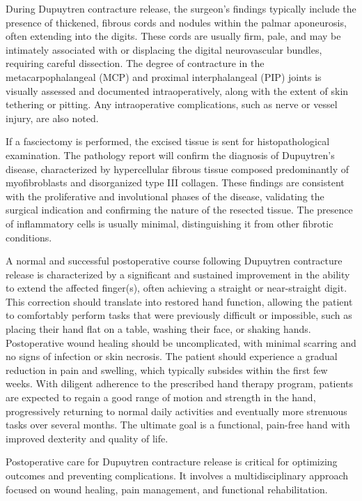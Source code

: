 During Dupuytren contracture release, the surgeon's findings typically include the presence of thickened, fibrous cords and nodules within the palmar aponeurosis, often extending into the digits. These cords are usually firm, pale, and may be intimately associated with or displacing the digital neurovascular bundles, requiring careful dissection. The degree of contracture in the metacarpophalangeal (MCP) and proximal interphalangeal (PIP) joints is visually assessed and documented intraoperatively, along with the extent of skin tethering or pitting. Any intraoperative complications, such as nerve or vessel injury, are also noted.

If a fasciectomy is performed, the excised tissue is sent for histopathological examination. The pathology report will confirm the diagnosis of Dupuytren's disease, characterized by hypercellular fibrous tissue composed predominantly of myofibroblasts and disorganized type III collagen. These findings are consistent with the proliferative and involutional phases of the disease, validating the surgical indication and confirming the nature of the resected tissue. The presence of inflammatory cells is usually minimal, distinguishing it from other fibrotic conditions.

A normal and successful postoperative course following Dupuytren contracture release is characterized by a significant and sustained improvement in the ability to extend the affected finger(s), often achieving a straight or near-straight digit. This correction should translate into restored hand function, allowing the patient to comfortably perform tasks that were previously difficult or impossible, such as placing their hand flat on a table, washing their face, or shaking hands. Postoperative wound healing should be uncomplicated, with minimal scarring and no signs of infection or skin necrosis. The patient should experience a gradual reduction in pain and swelling, which typically subsides within the first few weeks. With diligent adherence to the prescribed hand therapy program, patients are expected to regain a good range of motion and strength in the hand, progressively returning to normal daily activities and eventually more strenuous tasks over several months. The ultimate goal is a functional, pain-free hand with improved dexterity and quality of life.

Postoperative care for Dupuytren contracture release is critical for optimizing outcomes and preventing complications. It involves a multidisciplinary approach focused on wound healing, pain management, and functional rehabilitation.

